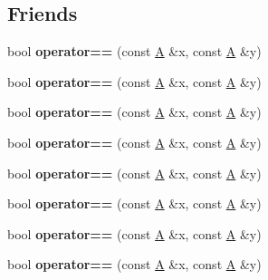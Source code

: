\subsection*{Friends}
\begin{DoxyCompactItemize}
\item 
\mbox{\label{struct_a_a59073da68d4f3b056a66a0ee33bed0da}} 
bool {\bfseries operator==} (const \mbox{\hyperlink{struct_a}{A}} \&x, const \mbox{\hyperlink{struct_a}{A}} \&y)
\item 
\mbox{\label{struct_a_a59073da68d4f3b056a66a0ee33bed0da}} 
bool {\bfseries operator==} (const \mbox{\hyperlink{struct_a}{A}} \&x, const \mbox{\hyperlink{struct_a}{A}} \&y)
\item 
\mbox{\label{struct_a_a59073da68d4f3b056a66a0ee33bed0da}} 
bool {\bfseries operator==} (const \mbox{\hyperlink{struct_a}{A}} \&x, const \mbox{\hyperlink{struct_a}{A}} \&y)
\item 
\mbox{\label{struct_a_a59073da68d4f3b056a66a0ee33bed0da}} 
bool {\bfseries operator==} (const \mbox{\hyperlink{struct_a}{A}} \&x, const \mbox{\hyperlink{struct_a}{A}} \&y)
\item 
\mbox{\label{struct_a_a59073da68d4f3b056a66a0ee33bed0da}} 
bool {\bfseries operator==} (const \mbox{\hyperlink{struct_a}{A}} \&x, const \mbox{\hyperlink{struct_a}{A}} \&y)
\item 
\mbox{\label{struct_a_a59073da68d4f3b056a66a0ee33bed0da}} 
bool {\bfseries operator==} (const \mbox{\hyperlink{struct_a}{A}} \&x, const \mbox{\hyperlink{struct_a}{A}} \&y)
\item 
\mbox{\label{struct_a_a59073da68d4f3b056a66a0ee33bed0da}} 
bool {\bfseries operator==} (const \mbox{\hyperlink{struct_a}{A}} \&x, const \mbox{\hyperlink{struct_a}{A}} \&y)
\item 
\mbox{\label{struct_a_a59073da68d4f3b056a66a0ee33bed0da}} 
bool {\bfseries operator==} (const \mbox{\hyperlink{struct_a}{A}} \&x, const \mbox{\hyperlink{struct_a}{A}} \&y)
\item 
\mbox{\label{struct_a_a59073da68d4f3b056a66a0ee33bed0da}} 

\end{DoxyCompactItemize}
